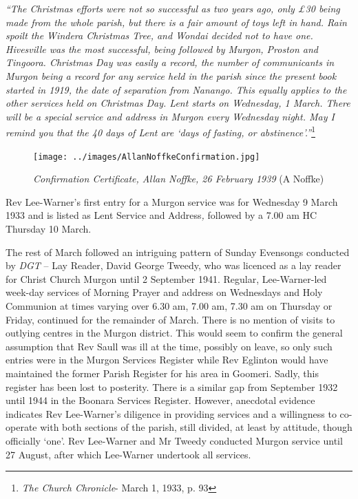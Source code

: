 \emph{``The Christmas efforts were not so successful as two years ago, only \pounds30 being made from the whole parish, but there is a fair amount of toys left in hand. Rain spoilt the Windera Christmas Tree, and Wondai decided not to have one. Hivesville was the most successful, being followed by Murgon, Proston and Tingoora. Christmas Day was easily a record, the number of communicants in Murgon being a record for any service held in the parish since the present book started in 1919, the date of separation from Nanango. This equally applies to the other services held on Christmas Day. Lent starts on Wednesday, 1 March. There will be a special service and address in Murgon every Wednesday night. May I remind you that the 40 days of Lent are `days of fasting, or abstinence'.''}\footnote{\emph{The Church Chronicle}- March 1, 1933, p. 93}


\medskip








\begin{figure}[!htb]
\begin{center}
\texttt{[image: ../images/AllanNoffkeConfirmation.jpg]}
\caption{{\itshape Confirmation Certificate, Allan Noffke, 26 February 1939} {\scriptsize(A Noffke)}}
\end{center}
\end{figure}




Rev Lee-Warner's first entry for a Murgon service was for Wednesday 9 March 1933 and is listed as Lent Service and Address\emph{,} followed by a 7.00 am HC Thursday 10 March.



The rest of March followed an intriguing pattern of Sunday Evensongs conducted by \emph{DGT} -- Lay Reader, David George Tweedy, who was licenced as a lay reader for Christ Church Murgon until 2 September 1941. Regular, Lee-Warner-led week-day services of Morning Prayer and address on Wednesdays and Holy Communion at times varying over 6.30 am, 7.00 am, 7.30 am on Thursday or Friday, continued for the remainder of March. There is no mention of visits to outlying centres in the Murgon district. This would seem to confirm the general assumption that Rev Saull was ill at the time, possibly on leave, so only such entries were in the Murgon Services Register while Rev Eglinton would have maintained the former Parish Register for his area in Goomeri. Sadly, this register has been lost to posterity. There is a similar gap from September 1932 until 1944 in the Boonara Services Register. However, anecdotal evidence indicates Rev Lee-Warner's diligence in providing services and a willingness to co-operate with both sections of the parish, still divided, at least by attitude, though officially `one'. Rev Lee-Warner and Mr Tweedy conducted Murgon service until 27 August, after which Lee-Warner undertook all services.



